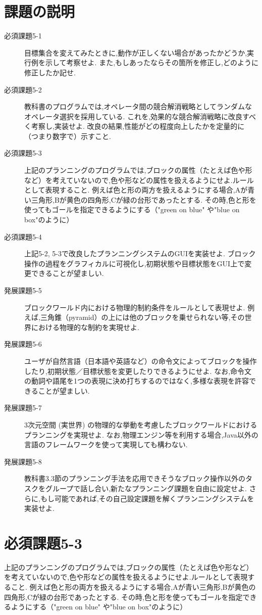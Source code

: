 \documentclass[uplatex,12pt]{jsarticle}
\begin{document}
\section{課題の説明}
\begin{description}
\item[必須課題5-1] 目標集合を変えてみたときに,動作が正しくない場合があったかどうか,実行例を示して考察せよ.
また,もしあったならその箇所を修正し,どのように修正したか記せ.
\item[必須課題5-2] 教科書のプログラムでは,オペレータ間の競合解消戦略としてランダムなオペレータ選択を採用している.
これを,効果的な競合解消戦略に改良すべく考察し,実装せよ.
改良の結果,性能がどの程度向上したかを定量的に（つまり数字で）示すこと.
\item[必須課題5-3] 上記のプランニングのプログラムでは,ブロックの属性（たとえば色や形など）を考えていないので,色や形などの属性を扱えるようにせよ.ルールとして表現すること.
例えば色と形の両方を扱えるようにする場合,Aが青い三角形,Bが黄色の四角形,Cが緑の台形であったとする.
その時,色と形を使ってもゴールを指定できるようにする（"green on blue" や"blue on box"のように）
\item[必須課題5-4] 上記5-2, 5-3で改良したプランニングシステムのGUIを実装せよ.
ブロック操作の過程をグラフィカルに可視化し,初期状態や目標状態をGUI上で変更できることが望ましい.
\item[発展課題5-5] ブロックワールド内における物理的制約条件をルールとして表現せよ.
例えば,三角錐（pyramid）の上には他のブロックを乗せられない等,その世界における物理的な制約を実現せよ.
\item[発展課題5-6] ユーザが自然言語（日本語や英語など）の命令文によってブロックを操作したり,初期状態／目標状態を変更したりできるようにせよ.
なお,命令文の動詞や語尾を1つの表現に決め打ちするのではなく,多様な表現を許容できることが望ましい.
\item[発展課題5-7] 3次元空間 (実世界) の物理的な挙動を考慮したブロックワールドにおけるプランニングを実現せよ.
なお,物理エンジン等を利用する場合,Java以外の言語のフレームワークを使って実現しても構わない.
\item[発展課題5-8] 教科書3.3節のプランニング手法を応用できそうなブロック操作以外のタスクをグループで話し合い,新たなプランニング課題を自由に設定せよ.
さらに,もし可能であれば,その自己設定課題を解くプランニングシステムを実装せよ.
\end{description}

\section{必須課題5-3}
\begin{screen}
    上記のプランニングのプログラムでは,ブロックの属性（たとえば色や形など）を考えていないので,色や形などの属性を扱えるようにせよ.ルールとして表現すること.
    例えば色と形の両方を扱えるようにする場合,Aが青い三角形,Bが黄色の四角形,Cが緑の台形であったとする.
    その時,色と形を使ってもゴールを指定できるようにする（"green on blue" や"blue on box"のように）
\end{screen}
\end{document}
